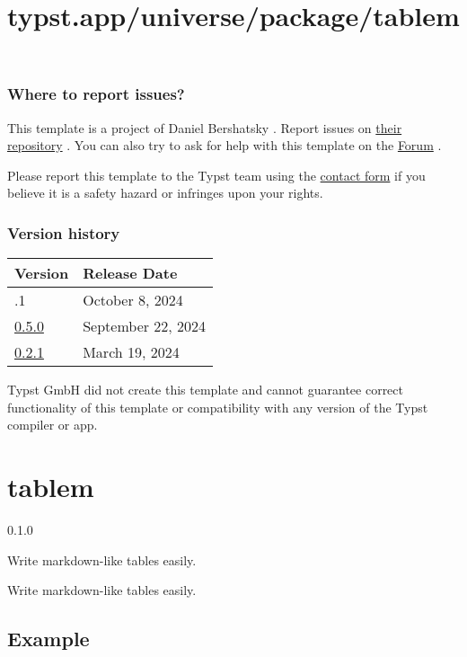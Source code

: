 \subsubsection{Where to report issues?}\label{where-to-report-issues}

This template is a project of Daniel Bershatsky . Report issues on
\href{https://github.com/daskol/typst-templates}{their repository} . You
can also try to ask for help with this template on the
\href{https://forum.typst.app}{Forum} .

Please report this template to the Typst team using the
\href{https://typst.app/contact}{contact form} if you believe it is a
safety hazard or infringes upon your rights.

\label{versions}
\subsubsection{Version history}\label{version-history}

\begin{longtable}[]{@{}ll@{}}
\toprule\noalign{}
Version & Release Date \\
\midrule\noalign{}
\endhead
\bottomrule\noalign{}
\endlastfoot
0.5.1 & October 8, 2024 \\
\href{https://typst.app/universe/package/bloated-neurips/0.5.0/}{0.5.0}
& September 22, 2024 \\
\href{https://typst.app/universe/package/bloated-neurips/0.2.1/}{0.2.1}
& March 19, 2024 \\
\end{longtable}

Typst GmbH did not create this template and cannot guarantee correct
functionality of this template or compatibility with any version of the
Typst compiler or app.


\title{typst.app/universe/package/tablem}

\label{banner}
\section{tablem}\label{tablem}

{ 0.1.0 }

Write markdown-like tables easily.

\label{readme}
Write markdown-like tables easily.

\subsection{Example}\label{example}


